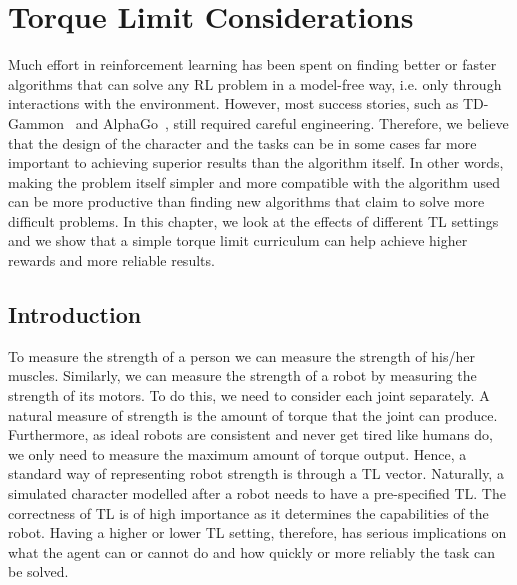 \chapter{Torque Limit Considerations}
\label{ch:envparams}

Much effort in reinforcement learning has been spent on finding better or faster algorithms that can solve any \ac{RL} problem in a model-free way, i.e. only through interactions with the environment. However, most success stories, such as TD-Gammon~\cite{tdgammon} and AlphaGo~\cite{alphago}, still required careful engineering. Therefore, we believe that the design of the character and the tasks can be in some cases far more important to achieving superior results than the algorithm itself. In other words, making the problem itself simpler and more compatible with the algorithm used can be more productive than finding new algorithms that claim to solve more difficult problems. In this chapter, we look at the effects of different \ac{TL} settings and we show that a simple torque limit curriculum can help achieve higher rewards and more reliable results.

\section{Introduction}
\label{sec:params_torque}

To measure the strength of a person we can measure the strength of his/her muscles. Similarly, we can measure the strength of a robot by measuring the strength of its motors. To do this, we need to consider each joint separately. A natural measure of strength is the amount of torque that the joint can produce. Furthermore, as ideal robots are consistent and never get tired like humans do, we only need to measure the maximum amount of torque output. Hence, a standard way of representing robot strength is through a \ac{TL} vector. Naturally, a simulated character modelled after a robot needs to have a pre-specified \ac{TL}. The correctness of \ac{TL} is of high importance as it determines the capabilities of the robot. Having a higher or lower \ac{TL} setting, therefore, has serious implications on what the agent can or cannot do and how quickly or more reliably the task can be solved.

